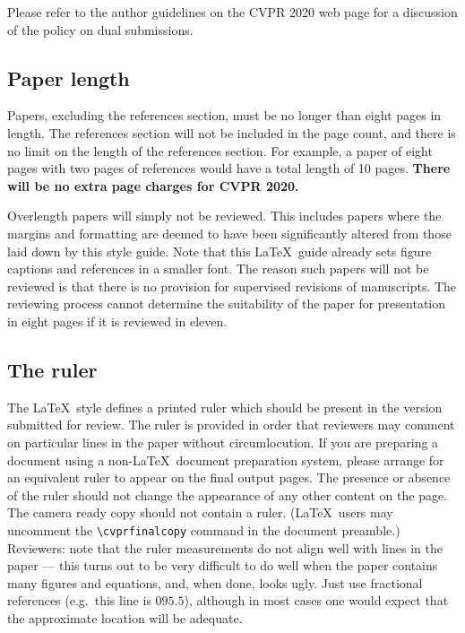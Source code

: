 \documentclass[10pt,twocolumn,letterpaper]{article}
\begin{document}
\begin{CJK}{UTF8}{bkai}
   Please refer to the author guidelines on the CVPR 2020 web page for a
   discussion of the policy on dual submissions.

   \subsection{Paper length}
   Papers, excluding the references section,
   must be no longer than eight pages in length. The references section
   will not be included in the page count, and there is no limit on the
   length of the references section. For example, a paper of eight pages
   with two pages of references would have a total length of 10 pages.
      {\bf There will be no extra page charges for CVPR 2020.}

   Overlength papers will simply not be reviewed.  This includes papers
   where the margins and formatting are deemed to have been significantly
   altered from those laid down by this style guide.  Note that this
   \LaTeX\ guide already sets figure captions and references in a smaller font.
   The reason such papers will not be reviewed is that there is no provision for
   supervised revisions of manuscripts.  The reviewing process cannot determine
   the suitability of the paper for presentation in eight pages if it is
   reviewed in eleven.

   \subsection{The ruler}
   The \LaTeX\ style defines a printed ruler which should be present in the
   version submitted for review.  The ruler is provided in order that
   reviewers may comment on particular lines in the paper without
   circumlocution.  If you are preparing a document using a non-\LaTeX\
   document preparation system, please arrange for an equivalent ruler to
   appear on the final output pages.  The presence or absence of the ruler
   should not change the appearance of any other content on the page.  The
   camera ready copy should not contain a ruler. (\LaTeX\ users may uncomment
   the \verb'\cvprfinalcopy' command in the document preamble.)  Reviewers:
   note that the ruler measurements do not align well with lines in the paper
   --- this turns out to be very difficult to do well when the paper contains
   many figures and equations, and, when done, looks ugly.  Just use fractional
   references (e.g.\ this line is $095.5$), although in most cases one would
   expect that the approximate location will be adequate.


\end{CJK}
\end{document}

